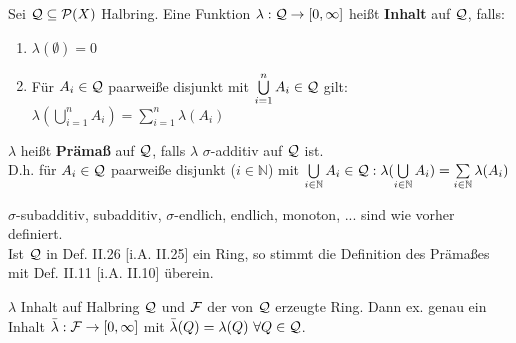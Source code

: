 \documentclass[11pt,a4paper,fleqn,openany]{report}
\begin{document}
    \begin{definition}[i.A. II.25]
      Sei $\mathcal{Q} \subseteq \mathcal{P}(X)$ Halbring. Eine Funktion $\lambda: \mathcal{Q} \to [0, \infty]$ heißt \textbf{Inhalt} auf $\mathcal{Q}$, falls:
      \begin{enumerate}[label=\roman*)]
        \item $\lambda(\emptyset) = 0$
        \item Für $A_i \in \mathcal{Q}$ paarweiße disjunkt mit $\bigcup\limits_{i=1}^n A_i \in \mathcal{Q}$ gilt: $\lambda(\bigcup\limits_{i=1}^n A_i) = \sum\limits_{i=1}^n \lambda(A_i)$
      \end{enumerate}
      $\lambda$ heißt \textbf{Prämaß} auf $\mathcal{Q}$, falls $\lambda$ $\sigma$-additiv auf $\mathcal{Q}$ ist.\\
      D.h. für $A_i \in \mathcal{Q}$ paarweiße disjunkt ($i \in \mathbb{N}$) mit $\bigcup\limits_{i \in \mathbb{N}} A_i \in \mathcal{Q}: \lambda(\bigcup\limits_{i \in \mathbb{N}} A_i) = \sum\limits_{i \in \mathbb{N}} \lambda(A_i)$
    \end{definition}

    \begin{remark}
      $\sigma$-subadditiv, subadditiv, $\sigma$-endlich, endlich, monoton, ... sind wie vorher definiert.\\
      Ist $\mathcal{Q}$ in Def. II.26 [i.A. II.25] ein Ring, so stimmt die Definition des Prämaßes mit Def. II.11 [i.A. II.10] überein.
    \end{remark}

    \begin{theorem}[i.A. II.26]
      $\lambda$ Inhalt auf Halbring $\mathcal{Q}$ und $\mathcal{F}$ der von $\mathcal{Q}$ erzeugte Ring. Dann ex. genau ein Inhalt $\bar{\lambda}:\mathcal{F} \to [0, \infty]$ mit $\bar{\lambda}(Q)=\lambda(Q) \ \forall Q \in \mathcal{Q}$.
    \end{theorem}
\end{document}
